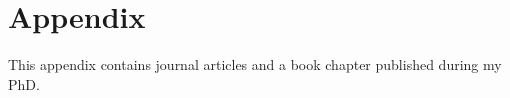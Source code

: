 \documentclass[a4paper,11pt]{scrbook}
\begin{document}
\chapter{Appendix}

\appendix

This appendix contains journal articles and a book chapter published during my PhD.





\end{document}
